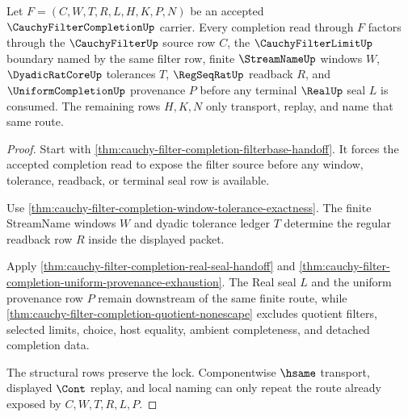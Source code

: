 \begin{theorem}
\label{thm:cauchy-filter-completion-cauchyfilter-limit-uniform-lock}
Let $F=(C,W,T,R,L,H,K,P,N)$ be an accepted $\CauchyFilterCompletionUp$ carrier. Every completion read through $F$ factors through the $\CauchyFilterUp$ source row $C$, the $\CauchyFilterLimitUp$ boundary named by the same filter row, finite $\StreamNameUp$ windows $W$, $\DyadicRatCoreUp$ tolerances $T$, $\RegSeqRatUp$ readback $R$, and $\UniformCompletionUp$ provenance $P$ before any terminal $\RealUp$ seal $L$ is consumed. The remaining rows $H,K,N$ only transport, replay, and name that same route.
\end{theorem}
\begin{proof}
Start with \autoref{thm:cauchy-filter-completion-filterbase-handoff}. It forces the accepted completion read to expose the filter source before any window, tolerance, readback, or terminal seal row is available.

Use \autoref{thm:cauchy-filter-completion-window-tolerance-exactness}. The finite StreamName windows $W$ and dyadic tolerance ledger $T$ determine the regular readback row $R$ inside the displayed packet.

Apply \autoref{thm:cauchy-filter-completion-real-seal-handoff} and \autoref{thm:cauchy-filter-completion-uniform-provenance-exhaustion}. The Real seal $L$ and the uniform provenance row $P$ remain downstream of the same finite route, while \autoref{thm:cauchy-filter-completion-quotient-nonescape} excludes quotient filters, selected limits, choice, host equality, ambient completeness, and detached completion data.

The structural rows preserve the lock. Componentwise $\hsame$ transport, displayed $\Cont$ replay, and local naming can only repeat the route already exposed by $C,W,T,R,L,P$.
\end{proof}

